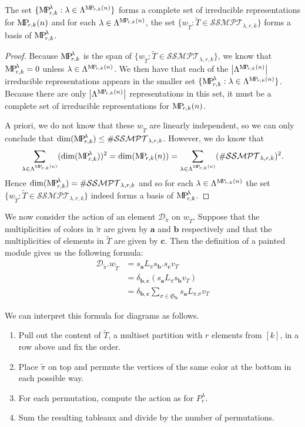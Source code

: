 \documentclass[ALCO,Unicode,published]{cedram}
\newcommand{\DD}{\mathcal{D}}
\newcommand{\SG}{\mathfrak{S}}
\newcommand{\bfa}{{\boldsymbol{a}}}
\newcommand{\bfb}{{\boldsymbol{b}}}
\newcommand{\bfc}{{\boldsymbol{c}}}
\newcommand{\MP}{{\rm M\!P\!}}
\newcommand{\SSMPT}{\mathcal{SSMPT}}
\newcommand{\tpi}{{\tilde{\pi}}}
\newcommand{\tT}{{\tilde{T}}}
\newcommand{\abs}[1]{\left| #1\right |}
\begin{document}
\begin{theorem} The set $\{\MP_{r,k}^\lambda:\lambda\in\Lambda^{\MP_{r,k}(n)}\}$ forms a complete set of irreducible representations for $\MP_{r,k}(n)$ and for each $\lambda\in\Lambda^{\MP_{r,k}(n)}$, the set $\{w_\tT:\tT\in\SSMPT_{\lambda,r,k}\}$ forms a basis of $\MP_{r,k}^\lambda$.
\end{theorem}

\begin{proof} 
    Because $\MP_{r,k}^\lambda$ is the span of $\{w_\tT:\tT\in\SSMPT_{\lambda,r,k}\}$, we know that $\MP_{r,k}^\lambda=0$ unless $\lambda\in\Lambda^{\MP_{r,k}(n)}$. We then have that each of the $\abs{\Lambda^{\MP_{r,k}(n)}}$ irreducible representations appears in the smaller set $\{\MP_{r,k}^\lambda:\lambda\in\Lambda^{\MP_{r,k}(n)}\}$. Because there are only $\abs{\Lambda^{\MP_{r,k}(n)}}$ representations in this set, it must be a complete set of irreducible representations for $\MP_{r,k}(n)$.

    A priori, we do not know that these $w_\tT$ are linearly independent, so we can only conclude that $\dim(\MP_{r,k}^\lambda)\leq\#\SSMPT_{\lambda,r,k}$. However, we do know that
\[\sum_{\lambda\in\Lambda^{\MP_{r,k}(n)}}(\dim(\MP_{r,k}^\lambda))^2=\dim(\MP_{r,k}(n))=\sum_{\lambda\in\Lambda^{\MP_{r,k}(n)}}(\#\SSMPT_{\lambda,r,k})^2.\] Hence $\dim(\MP_{r,k}^\lambda)=\#\SSMPT_{\lambda,r,k}$ and so for each $\lambda\in\Lambda^{\MP_{r,k}(n)}$ the set $\{w_\tT:\tT\in\SSMPT_{\lambda,r,k}\}$ indeed forms a basis of $\MP_{r,k}^\lambda$.
\end{proof}

We now consider the action of an element $\DD_\tpi$ on $w_\tT$. Suppose that the multiplicities of colors in $\tpi$ are given by $\bfa$ and $\bfb$ respectively and that the multiplicities of elements in $\tT$ are given by $\bfc$. Then the definition of a painted module gives us the following formula: \begin{align*}
    \DD_\tpi.w_\tT&=s_\bfa L_\pi s_\bfb . s_\bfc v_T\\
                  &=\delta_{\bfb,\bfc}(s_\bfa L_\pi s_\bfb v_T)\\
                  &=\delta_{\bfb,\bfc}\sum_{\sigma\in\SG_\bfb}s_\bfa L_{\pi.\sigma} v_T
\end{align*}

We can interpret this formula for diagrams as follows.
\begin{enumerate}
    \item[(i)] Pull out the content of $\tT$, a multiset partition with $r$ elements from $[k]$, in a row above and fix the order.
    \item[(ii)] Place $\tpi$ on top and permute the vertices of the same color at the bottom in each possible way.
    \item[(iii)] For each permutation, compute the action as for $P_r^\lambda$.
    \item[(iv)] Sum the resulting tableaux and divide by the number of permutations.
\end{enumerate}
\end{document}
